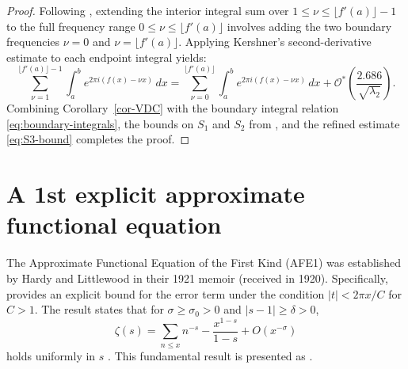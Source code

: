 \documentclass[11pt,letterpaper,oneside,reqno]{amsart}
\renewcommand{\^}[1]{\widehat{#1}}
\numberwithin{equation}{section}
\theoremstyle{remark}
\newcommand*{\corref}[1]{Corollary~\ref{#1}}
\begin{document}
\begin{proof}
Following \cite[eq.(2.36)]{PatelYang2024}, extending the interior integral sum over $1 \le \nu \le \lfloor f'(a) \rfloor - 1$ to the full frequency range $0 \le \nu \le \lfloor f'(a) \rfloor$ involves adding the two boundary frequencies $\nu = 0$ and $\nu = \lfloor f'(a) \rfloor$. Applying Kershner's second-derivative estimate \cite[eq.(2.2)]{PatelYang2024} to each endpoint integral yields:
\begin{equation}\label{eq:boundary-integrals}
\sum_{\nu = 1}^{\lfloor f'(a) \rfloor - 1} \int_{a}^{b} e^{2\pi i (f(x) - \nu x)} \, dx = \sum_{\nu = 0}^{\lfloor f'(a) \rfloor} \int_{a}^{b} e^{2\pi i (f(x) - \nu x)} \, dx + \mathcal{O}^*\!\left( \frac{2.686}{\sqrt{\lambda_2}} \right).
\end{equation}
Combining \corref{cor-VDC} with the boundary integral relation \eqref{eq:boundary-integrals}, the bounds on $S_1$ and $S_2$ from \cite{PatelYang2024}, and the refined estimate \eqref{eq:S3-bound} completes the proof.
\end{proof}
\section{A 1st explicit approximate functional equation} \label{section-proof-AFE1}
The Approximate Functional Equation of the First Kind (AFE1) was established by Hardy and Littlewood in their 1921 memoir \cite{HL1921} (received in 1920). Specifically, \cite[Lemma 2]{HL1921} provides an explicit bound for the error term under the condition $|t| < 2\pi x / C$ for $C > 1$. The result states that for $\sigma \ge \sigma_0 > 0$ and $|s - 1| \ge \delta > 0$,
\begin{equation}
    \zeta(s) = \sum_{n \le x} n^{-s} - \frac{x^{1-s}}{1-s} + O(x^{-\sigma})
\end{equation}
holds uniformly in $s$ \cite[Lemma 2]{HL1921}. This fundamental result is presented as \cite[Theorem 4.11]{Titchmarsh}.
\end{document}
